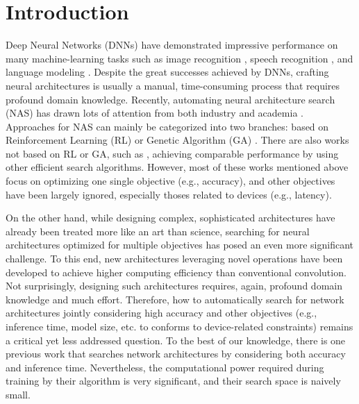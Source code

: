 \documentclass[runningheads]{llncs}
\def\eg{e.g.}
\begin{document}
\section{Introduction}%
Deep Neural Networks (DNNs) have demonstrated impressive performance on many machine-learning tasks such as image recognition \cite{krizhevsky2012imagenet}, speech recognition \cite{hannun2014deep}, and language modeling \cite{sutskever2014sequence}. Despite the great successes achieved by DNNs, crafting neural architectures is usually a manual, time-consuming process that requires profound domain knowledge. Recently, automating neural architecture search (NAS) has drawn lots of attention from both industry and academia \cite{negrinho2017deeparchitect,zoph2016neural}. Approaches for NAS can mainly be categorized into two branches: based on Reinforcement Learning (RL)  \cite{pham2018efficient,zoph2016neural,baker2016designing,zoph2017learning,zhong2017practical} or Genetic Algorithm (GA) \cite{real2017large,xie2017genetic,liu2017hierarchical,real2018regularized}. There are also works not based on RL or GA, such as \cite{liu2017progressive}, achieving comparable performance by using other efficient search algorithms. However, most of these works mentioned above focus on optimizing one single objective (\eg, accuracy), and other objectives have been largely ignored, especially thoses related to devices (\eg, latency).

On the other hand, while designing complex, sophisticated architectures have already been treated more like an art than science, searching for neural architectures optimized for multiple objectives has posed an even more significant challenge. To this end, new architectures leveraging novel operations \cite{howard2017mobilenets,zhang2017shufflenet,huang2017condensenet} have been developed to achieve higher computing efficiency than conventional convolution. Not surprisingly, designing such architectures requires, again, profound domain knowledge and much effort. Therefore, how to automatically search for network architectures jointly considering high accuracy and other objectives (\eg, inference time, model size, etc. to conforms to device-related constraints) remains a critical yet less addressed question. To the best of our knowledge, there is one previous work \cite{kimnemo} that searches network architectures by considering both accuracy and inference time. Nevertheless, the computational power required during training by their algorithm is very significant, and their search space is naively small.
\end{document}
